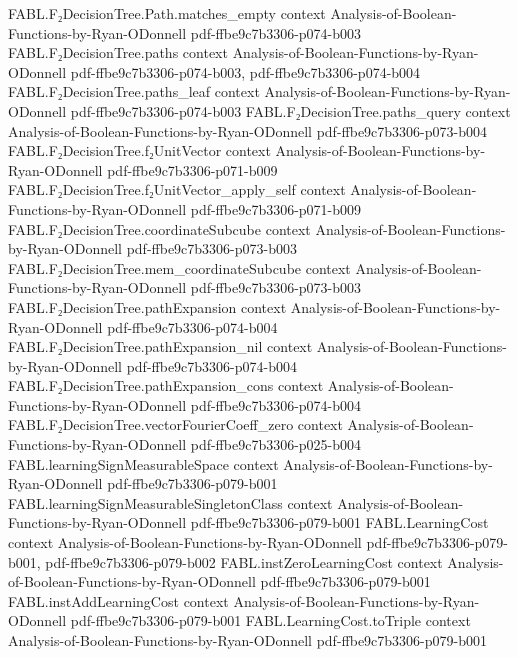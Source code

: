 \begin{theorem}
  {FABL.F₂DecisionTree.Path.matches_empty}
  {context}
  {Analysis-of-Boolean-Functions-by-Ryan-ODonnell}
  {pdf-ffbe9c7b3306-p074-b003}
\proofstep
  {FABL.F₂DecisionTree.paths}
  {context}
  {Analysis-of-Boolean-Functions-by-Ryan-ODonnell}
  {pdf-ffbe9c7b3306-p074-b003,
    pdf-ffbe9c7b3306-p074-b004}
\proofstep
  {FABL.F₂DecisionTree.paths_leaf}
  {context}
  {Analysis-of-Boolean-Functions-by-Ryan-ODonnell}
  {pdf-ffbe9c7b3306-p074-b003}
\proofstep
  {FABL.F₂DecisionTree.paths_query}
  {context}
  {Analysis-of-Boolean-Functions-by-Ryan-ODonnell}
  {pdf-ffbe9c7b3306-p073-b004}
\proofstep
  {FABL.F₂DecisionTree.f₂UnitVector}
  {context}
  {Analysis-of-Boolean-Functions-by-Ryan-ODonnell}
  {pdf-ffbe9c7b3306-p071-b009}
\proofstep
  {FABL.F₂DecisionTree.f₂UnitVector_apply_self}
  {context}
  {Analysis-of-Boolean-Functions-by-Ryan-ODonnell}
  {pdf-ffbe9c7b3306-p071-b009}
\proofstep
  {FABL.F₂DecisionTree.coordinateSubcube}
  {context}
  {Analysis-of-Boolean-Functions-by-Ryan-ODonnell}
  {pdf-ffbe9c7b3306-p073-b003}
\proofstep
  {FABL.F₂DecisionTree.mem_coordinateSubcube}
  {context}
  {Analysis-of-Boolean-Functions-by-Ryan-ODonnell}
  {pdf-ffbe9c7b3306-p073-b003}
\proofstep
  {FABL.F₂DecisionTree.pathExpansion}
  {context}
  {Analysis-of-Boolean-Functions-by-Ryan-ODonnell}
  {pdf-ffbe9c7b3306-p074-b004}
\proofstep
  {FABL.F₂DecisionTree.pathExpansion_nil}
  {context}
  {Analysis-of-Boolean-Functions-by-Ryan-ODonnell}
  {pdf-ffbe9c7b3306-p074-b004}
\proofstep
  {FABL.F₂DecisionTree.pathExpansion_cons}
  {context}
  {Analysis-of-Boolean-Functions-by-Ryan-ODonnell}
  {pdf-ffbe9c7b3306-p074-b004}
\proofstep
  {FABL.F₂DecisionTree.vectorFourierCoeff_zero}
  {context}
  {Analysis-of-Boolean-Functions-by-Ryan-ODonnell}
  {pdf-ffbe9c7b3306-p025-b004}
\proofstep
  {FABL.learningSignMeasurableSpace}
  {context}
  {Analysis-of-Boolean-Functions-by-Ryan-ODonnell}
  {pdf-ffbe9c7b3306-p079-b001}
\proofstep
  {FABL.learningSignMeasurableSingletonClass}
  {context}
  {Analysis-of-Boolean-Functions-by-Ryan-ODonnell}
  {pdf-ffbe9c7b3306-p079-b001}
\proofstep
  {FABL.LearningCost}
  {context}
  {Analysis-of-Boolean-Functions-by-Ryan-ODonnell}
  {pdf-ffbe9c7b3306-p079-b001,
    pdf-ffbe9c7b3306-p079-b002}
\proofstep
  {FABL.instZeroLearningCost}
  {context}
  {Analysis-of-Boolean-Functions-by-Ryan-ODonnell}
  {pdf-ffbe9c7b3306-p079-b001}
\proofstep
  {FABL.instAddLearningCost}
  {context}
  {Analysis-of-Boolean-Functions-by-Ryan-ODonnell}
  {pdf-ffbe9c7b3306-p079-b001}
\proofstep
  {FABL.LearningCost.toTriple}
  {context}
  {Analysis-of-Boolean-Functions-by-Ryan-ODonnell}
  {pdf-ffbe9c7b3306-p079-b001}

\end{theorem}
